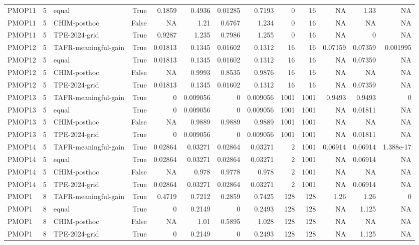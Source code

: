 \begin{tabular}{lrlrrrrrrrrrr}
PMOP11 & 5 & equal & True & 0.1859 & 0.4936 & 0.01285 & 0.7193 & 0 & 16 & NA & 1.33 & NA \\
PMOP11 & 5 & CHIM-posthoc & False & NA & 1.21 & 0.6767 & 1.234 & 0 & 16 & NA & NA & NA \\
PMOP11 & 5 & TPE-2024-grid & True & 0.9287 & 1.235 & 0.7986 & 1.255 & 0 & 16 & NA & 0 & NA \\
PMOP12 & 5 & TAFR-meaningful-gain & True & 0.01813 & 0.1345 & 0.01602 & 0.1312 & 16 & 16 & 0.07159 & 0.07359 & 0.001995 \\
PMOP12 & 5 & equal & True & 0.01813 & 0.1345 & 0.01602 & 0.1312 & 16 & 16 & NA & 0.07359 & NA \\
PMOP12 & 5 & CHIM-posthoc & False & NA & 0.9993 & 0.8535 & 0.9876 & 16 & 16 & NA & NA & NA \\
PMOP12 & 5 & TPE-2024-grid & True & 0.01813 & 0.1345 & 0.01602 & 0.1312 & 16 & 16 & NA & 0.07359 & NA \\
PMOP13 & 5 & TAFR-meaningful-gain & True & 0 & 0.009056 & 0 & 0.009056 & 1001 & 1001 & 0.9493 & 0.9493 & 0 \\
PMOP13 & 5 & equal & True & 0 & 0.009056 & 0 & 0.009056 & 1001 & 1001 & NA & 0.01811 & NA \\
PMOP13 & 5 & CHIM-posthoc & False & NA & 0.9889 & 0.9889 & 0.9889 & 1001 & 1001 & NA & NA & NA \\
PMOP13 & 5 & TPE-2024-grid & True & 0 & 0.009056 & 0 & 0.009056 & 1001 & 1001 & NA & 0.01811 & NA \\
PMOP14 & 5 & TAFR-meaningful-gain & True & 0.02864 & 0.03271 & 0.02864 & 0.03271 & 2 & 1001 & 0.06914 & 0.06914 & 1.388e-17 \\
PMOP14 & 5 & equal & True & 0.02864 & 0.03271 & 0.02864 & 0.03271 & 2 & 1001 & NA & 0.06914 & NA \\
PMOP14 & 5 & CHIM-posthoc & False & NA & 0.978 & 0.9778 & 0.978 & 2 & 1001 & NA & NA & NA \\
PMOP14 & 5 & TPE-2024-grid & True & 0.02864 & 0.03271 & 0.02864 & 0.03271 & 2 & 1001 & NA & 0.06914 & NA \\
PMOP1 & 8 & TAFR-meaningful-gain & True & 0.4719 & 0.7212 & 0.2859 & 0.7425 & 128 & 128 & 1.26 & 1.26 & 0 \\
PMOP1 & 8 & equal & True & 0 & 0.2149 & 0 & 0.2493 & 128 & 128 & NA & 1.125 & NA \\
PMOP1 & 8 & CHIM-posthoc & False & NA & 1.01 & 0.5895 & 1.028 & 128 & 128 & NA & NA & NA \\
PMOP1 & 8 & TPE-2024-grid & True & 0 & 0.2149 & 0 & 0.2493 & 128 & 128 & NA & 1.125 & NA \\

\end{tabular}

